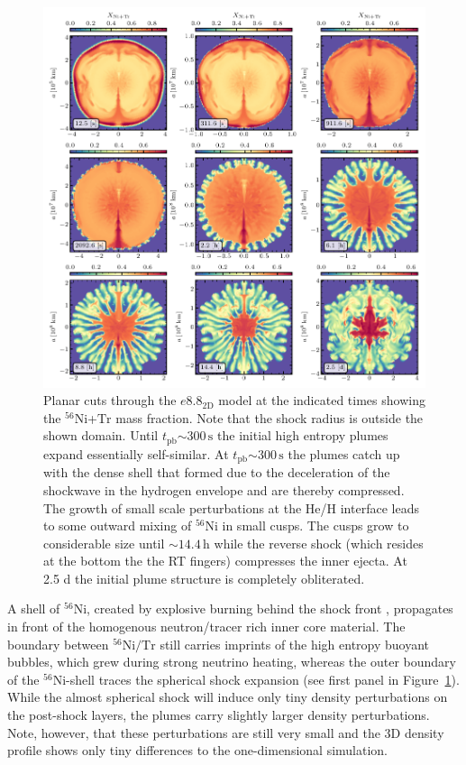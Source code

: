 \documentclass[fleqn,usenatbib]{mnras}
\newcommand{\tpb}{\ensuremath{t_{\text{pb}}}}
\newcommand{\nickel}{\ensuremath{\mathrm{^{56}Ni}}\xspace}
\newcommand{\tracer}{\ensuremath{\mathrm{Tr}}\xspace}
\newcommand{\s}{\ensuremath{\text{s}}}
\begin{document}
\begin{figure}%
 \centering
 \includegraphics[width=\textwidth,trim=0.2cm 0cm 0cm 0cm,clip]{pic/e8_10_3x3_NiX.pdf} 
 \caption{Planar cuts through the $e8.8_{\mathrm{2D}}$ model at the indicated times showing the \nickel+\tracer mass fraction. Note that the shock radius is outside the shown domain. Until $\tpb\mathord{\sim} 300\,\s$ the initial high entropy plumes expand essentially self-similar. At $\tpb\mathord{\sim} 300\,\s$ the plumes catch up with the dense shell that formed due to the deceleration of the shockwave in the hydrogen envelope and are thereby compressed. The growth of small scale perturbations at the He/H interface leads to some outward mixing of \nickel in small cusps. The cusps grow to considerable size until $\mathord{\sim}14.4\,\mathrm{h}$ while the reverse shock (which resides at the bottom the the RT fingers) compresses the inner ejecta. At 2.5 d the initial plume structure is completely obliterated.}
 \label{fig:e8 3d 4times}
\end{figure}
A shell of \nickel, created by explosive burning behind the shock front \citep{Kifonidis2006}, propagates in front of the homogenous neutron/tracer rich inner core material. The boundary between $\nickel/\tracer$ still carries imprints of the high entropy buoyant bubbles, which grew during strong neutrino heating, whereas the outer boundary of the \nickel-shell traces the spherical shock expansion (see first panel in Figure~\ref{fig:e8 3d 4times}).  
While the almost spherical shock will induce only tiny density perturbations on the post-shock layers, the plumes carry slightly larger density perturbations. Note, however, that these perturbations are still very small and the 3D density profile shows only tiny differences to the one-dimensional simulation.
\end{document}
